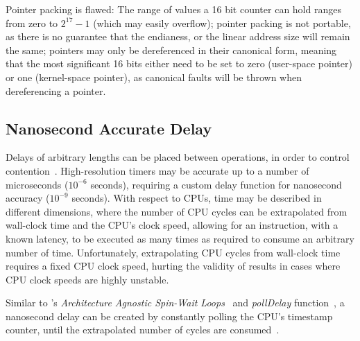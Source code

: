 Pointer packing is flawed: The range of values a 16 bit counter can hold ranges
from zero to $2^{17}-1$ (which may easily overflow); pointer packing is not
portable, as there is no guarantee that the endianess, or the linear address
size will remain the same; pointers may only be dereferenced in their canonical
form, meaning that the most significant 16 bits either need to be set to zero
(user-space pointer) or one (kernel-space pointer), as canonical faults will be
thrown when dereferencing a pointer.

\subsection{Nanosecond Accurate Delay}
Delays of arbitrary lengths can be placed between operations, in order to
control contention~\citep{valois1994queues}. High-resolution timers may be accurate up
to a number of microseconds ($10^{-6}$ seconds), requiring a custom delay
function for nanosecond accuracy ($10^{-9}$ seconds). With respect to CPUs,
time may be described in different dimensions,
where the number of CPU cycles can be extrapolated from wall-clock time and the
CPU's clock speed, allowing for an instruction, with a known latency, to be
executed as many times as required to consume an arbitrary number of
time. Unfortunately, extrapolating CPU cycles from wall-clock time
requires a fixed CPU clock speed, hurting the validity of results in cases
where CPU clock speeds are highly unstable.


Similar to \citeauthor{intel2018spinloop}'s
\emph{Architecture Agnostic Spin-Wait Loops}~\citep{intel2018spinloop} and
\emph{pollDelay} function~\citep[Example~2.3]{intelmanualoptimization}, a
nanosecond delay can be created by constantly polling the CPU's timestamp
counter, until the extrapolated number of cycles are
consumed~\cite{ramalhete2019delay}.


